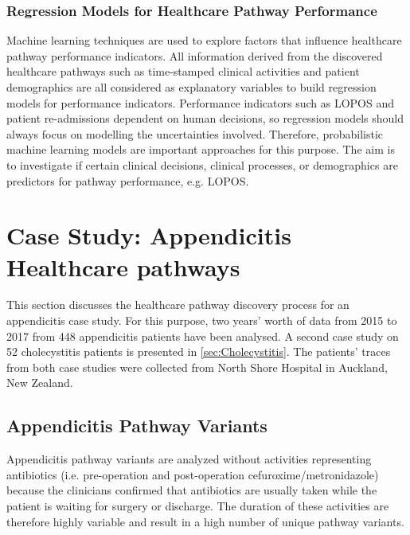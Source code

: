 \subsubsection{Regression Models for Healthcare Pathway Performance}
Machine learning techniques are used to explore factors that influence healthcare pathway performance indicators. All information derived from the discovered healthcare pathways such as time-stamped clinical activities and patient demographics are all considered as explanatory variables to build regression models for performance indicators. Performance indicators such as LOPOS and patient re-admissions dependent on human decisions, so regression models should always focus on modelling the uncertainties involved. 
Therefore, probabilistic machine learning models are important approaches for this purpose.  The aim is to investigate if certain clinical decisions, clinical processes, or demographics are predictors for  pathway performance, e.g. LOPOS.

\section{Case Study: Appendicitis Healthcare pathways}
This section discusses the healthcare pathway discovery process for an appendicitis case study. For this purpose, two years’ worth of data from 2015 to 2017 from 448 appendicitis patients have been analysed. 
A second case study on 52 cholecystitis patients is presented in \ref{sec:Cholecystitis}.
The patients' traces from both case studies were collected from North Shore Hospital in Auckland, New Zealand.

\subsection{Appendicitis Pathway Variants}
Appendicitis pathway variants are analyzed without activities representing antibiotics (i.e. pre-operation and post-operation cefuroxime/metronidazole) because the clinicians confirmed that antibiotics are usually taken while the patient is waiting for surgery or discharge. The duration of these activities are therefore highly variable and result in a high number of unique pathway variants.

